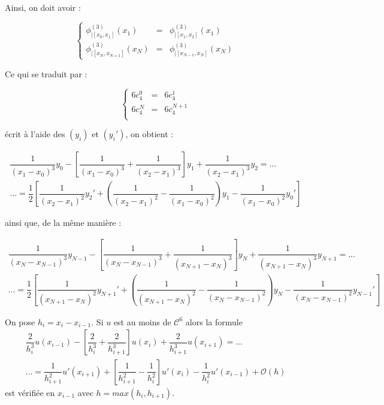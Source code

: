 Ainsi, on doit avoir :

\begin{equation}
\left\lbrace
\begin{array}{rcl}
\phi_{|[x_0, x_1]}^{(3)}(x_1) & = & \phi_{|[x_1, x_2]}^{(3)}(x_1) \\
\phi_{|[x_N, x_{N+1}]}^{(3)}(x_N) & = & \phi_{|[x_{N-1}, x_N]}^{(3)}(x_N)
\end{array}
\right.
\label{NOK_condition}
\end{equation}

Ce qui se traduit par :

\begin{equation}
\left\lbrace
\begin{array}{rcl}
6 c_4^0 & = & 6 c_4^1 \\
6 c_4^{N} & = & 6 c_4^{N+1} \\
\end{array}
\right.
\end{equation}

écrit à l'aide des $(y_i)$ et $(y_i')$, on obtient :

\begin{multline}
\dfrac{1}{(x_1-x_0)^3} y_0 - \left[ \dfrac{1}{(x_1 - x_0)^3} + \dfrac{1}{(x_2-x_1)^3} \right] y_1 + \dfrac{1}{(x_2 - x_1)^3} y_2 = ... \\
... =\dfrac{1}{2} \left[ \dfrac{1}{(x_2-x_1)^2} y_2' + \left( \dfrac{1}{(x_2-x_1)^2} - \dfrac{1}{(x_1-x_0)^2} \right) y_1 - \dfrac{1}{(x_1 - x_0)^2} y_0' \right]
\end{multline}

ainsi que, de la même manière :

\begin{multline}
\dfrac{1}{(x_N-x_{N-1})^3} y_{N-1} - \left[ \dfrac{1}{(x_N - x_{N-1})^3} + \dfrac{1}{(x_{N+1}-x_N)^3} \right] y_N + \dfrac{1}{(x_{N+1} - x_N)^3} y_{N+1} = ... \\
...= \dfrac{1}{2} \left[ \dfrac{1}{(x_{N+1}-x_N)^2} y_{N+1}' + \left( \dfrac{1}{(x_{N+1}-x_N)^2} - \dfrac{1}{(x_N-x_{N-1})^2} \right) y_N - \dfrac{1}{(x_N - x_{N-1})^2} y_{N-1}' \right]
\end{multline}

\begin{proposition}
On pose $h_i = x_i - x_{i-1}$. Si $u$ est au moins de $\mathcal{C}^6$ alors la formule 
\begin{multline}
\dfrac{2}{h_i^3} u(x_{i-1}) - \left[ \dfrac{2}{h_i^3} + \dfrac{2}{h_{i+1}^3} \right] u(x_i) + \dfrac{2}{h_{i+1}^3} u(x_{i+1}) = ... \\
... =\dfrac{1}{h_{i+1}^2} u'(x_{i+1}) + \left[ \dfrac{1}{h_{i+1}^2} - \dfrac{1}{h_i^2} \right] u'(x_i) - \dfrac{1}{h_i^2} u'(x_{i-1}) + \mathcal{O}(h)
\end{multline}
est vérifiée en $x_{i-1}$ avec $h=max(h_i, h_{i+1})$.
\label{prop:NOK compact scheme}
\end{proposition}

